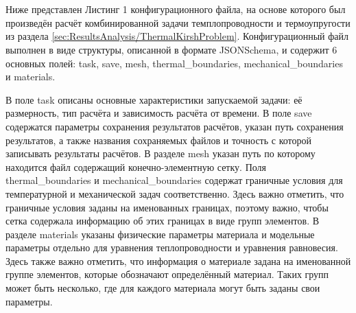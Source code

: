 \chapter{}\label{app:A}

Ниже представлен Листинг 1 конфигурационного файла, на основе которого был произведён расчёт комбинированной задачи темплопроводности и термоупругости из раздела \ref{sec:ResultsAnalysis/ThermalKirshProblem}. Конфигурационный файл выполнен в виде структуры, описанной в формате JSONSchema, и содержит 6 основных полей: task, save, mesh, thermal\_boundaries, mechanical\_boundaries и materials.

В поле task описаны основные характеристики запускаемой задачи: её размерность, тип расчёта и зависимость расчёта от времени. В поле save содержатся параметры сохранения результатов расчётов, указан путь сохранения результатов, а также названия сохраняемых файлов и точность с которой записывать результаты расчётов. В разделе mesh указан путь по которому находится файл содержащий конечно-элементную сетку. Поля thermal\_boundaries и mechanical\_boundaries содержат граничные условия для температурной и механической задач соответственно. Здесь важно отметить, что граничные условия заданы на именованных границах, поэтому важно, чтобы сетка содержала информацию об этих границах в виде групп элементов. В разделе materials указаны физические параметры материала и модельные параметры отдельно для уравнения теплопроводности и уравнения равновесия. Здесь также важно отметить, что информация о материале задана на именованной группе элементов, которые обозначают определённый материал. Таких групп может быть несколько, где для каждого материала могут быть заданы свои параметры.

